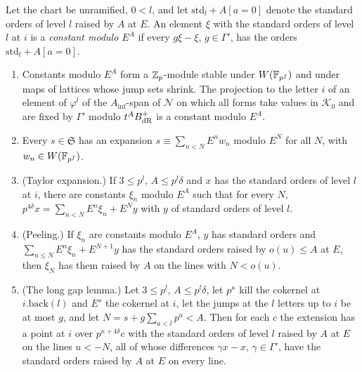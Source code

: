 \begin{lemma}\label{lem:long-gap}
Let the chart be unramified, $0<l$, and let $\mathrm{std}_l+A[a=0]$ denote the standard orders of level $l$ raised by $A$ at $E$. An element $\xi$ with the standard orders of level $l$ at $i$ is a \emph{constant modulo $E^A$} if every $g\xi-\xi$, $g\in\Gamma'$, has the orders $\mathrm{std}_l+A[a=0]$.
\begin{enumerate}[label=\textup{(\alph*)}]
\item Constants modulo $E^A$ form a $\mathbb{Z}_p$-module stable under $W(\mathbb{F}_{p^f})$ and under maps of lattices whose jump sets shrink. The projection to the letter $i$ of an element of $\varphi^l$ of the $A_{\inf}$-span of $\mathcal N$ on which all forms take values in $\mathcal K_0$ and are fixed by $\Gamma'$ modulo
$t^AB_{\rm dR}^+$ is a constant modulo $E^A$.
\item Every $s\in\mathfrak S$ has an expansion $s\equiv\sum_{n<N}E^nw_n$ modulo $E^N$ for all $N$, with $w_n\in W(\mathbb{F}_{p^f})$.
\item (Taylor expansion.) If $3\le p^l$, $A\le p^l\delta$ and $x$ has the standard orders of level $l$ at $i$, there are constants $\xi_n$ modulo $E^A$ such that for every $N$, $p^{4\delta}x=\sum_{n<N}E^n\xi_n+E^Ny$ with $y$ of standard orders of level $l$.
\item (Peeling.) If $\xi_n$ are constants modulo $E^A$, $y$ has standard orders and $\sum_{n\le N}E^n\xi_n+E^{N+1}y$ has the standard orders raised by $o(u)\le A$ at $E$, then $\xi_N$ has them raised by $A$ on the lines with $N<o(u)$.
\item (The long gap lemma.) Let $3\le p^l$, $A\le p^l\delta$, let $p^\kappa$ kill the cokernel at $i.\mathrm{back}(l)$ and $E^s$ the cokernel at $i$, let the jumps at the $l$ letters up to $i$ be at most $g$, and let $N=s+g\sum_{a<l}p^a<A$. Then for each $c$ the extension has a point at $i$ over $p^{\kappa+4\delta}c$
with the standard orders of level $l$ raised by $A$ at $E$ on the lines $u<-N$, all of whose differences $\gamma x-x$, $\gamma\in\Gamma'$, have the standard orders raised by $A$ at $E$ on every line.
\end{enumerate}
\end{lemma}

